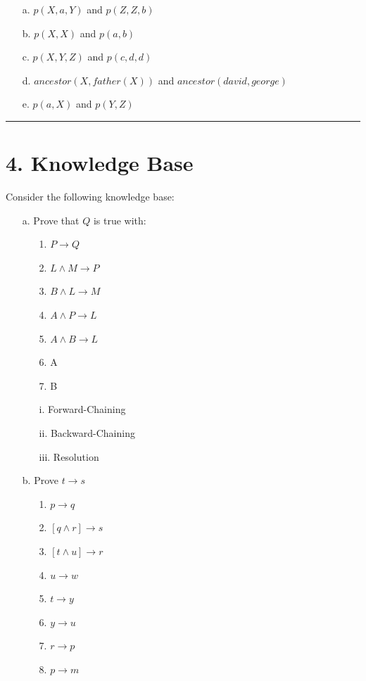 \documentclass[11pt]{article}
\begin{document}
\begin{flushleft}
\begin{enumerate}
    \item[a.] $p(X, a, Y)$ and $p(Z, Z, b)$
    \item[b.] $p(X, X)$ and $p(a, b)$
    \item[c.] $p(X, Y, Z)$ and $p(c, d, d)$
    \item[d.] $ancestor(X, father(X))$ and $ancestor(david, george)$
    \item[e.] $p(a, X)$ and $p(Y,Z)$

\end{enumerate}

\rule[0.1pt]{40em}{1.0pt}

\section*{4. Knowledge Base} Consider the following knowledge base:

\begin{enumerate}

    \item[a.] Prove that $Q$ is true with:

        \begin{enumerate}
            \item[1.] $P \rightarrow Q$
            \item[2.] $L \land M \rightarrow P$
            \item[3.] $B \land L \rightarrow M$
            \item[4.] $A \land P \rightarrow L$
            \item[5.] $A \land B \rightarrow L$
            \item[6.] A
            \item[7.] B
        \end{enumerate}

        \begin{enumerate}
            \item[i.] Forward-Chaining
            \item[ii.] Backward-Chaining
            \item[iii.] Resolution
        \end{enumerate}

    \item[b.] Prove $t \rightarrow s$

        \begin{enumerate}
            \item[1.] $p \rightarrow q$
            \item[2.] $[q \land r] \rightarrow s$
            \item[3.] $[t \land u] \rightarrow r$
            \item[4.] $u \rightarrow w$
            \item[5.] $t \rightarrow y$
            \item[6.] $y \rightarrow u$
            \item[7.] $r \rightarrow p$
            \item[8.] $p \rightarrow m$
        \end{enumerate}


\end{enumerate}
\end{flushleft}
\end{document}
